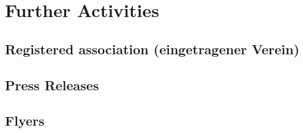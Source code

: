 ﻿\section{Further Activities}

\subsection{Registered association (eingetragener Verein)}

\subsection{Press Releases}

\subsection{Flyers}